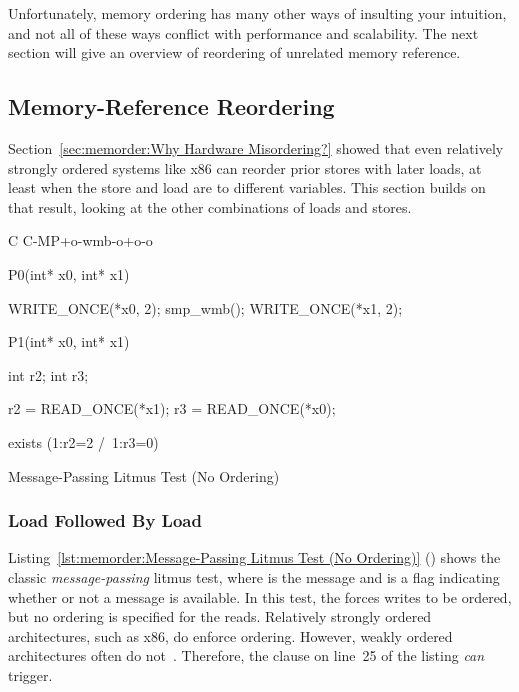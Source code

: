 Unfortunately, memory ordering has many other ways of insulting your
intuition, and not all of these ways conflict with performance and
scalability.
The next section will give an overview of reordering of unrelated
memory reference.
\fi

\subsection{Memory-Reference Reordering}
\label{sec:memorder:Memory-Reference Reordering}

Section~\ref{sec:memorder:Why Hardware Misordering?}
showed that even relatively strongly ordered systems like x86
can reorder prior stores with later loads, at least when the
store and load are to different variables.
This section builds on that result, looking at the other combinations of
loads and stores.


\begin{listing}[tbp]
{ \scriptsize
\begin{verbbox}[\LstLineNo]
C C-MP+o-wmb-o+o-o

{
}


P0(int* x0, int* x1) {

  WRITE_ONCE(*x0, 2);
  smp_wmb();
  WRITE_ONCE(*x1, 2);

}

P1(int* x0, int* x1) {

  int r2;
  int r3;

  r2 = READ_ONCE(*x1);
  r3 = READ_ONCE(*x0);

}

exists (1:r2=2 /\ 1:r3=0)
\end{verbbox}
}
\centering
\theverbbox
\caption{Message-Passing Litmus Test (No Ordering)}
\label{lst:memorder:Message-Passing Litmus Test (No Ordering)}
\end{listing}

\subsubsection{Load Followed By Load}
Listing~\ref{lst:memorder:Message-Passing Litmus Test (No Ordering)}
()
shows the classic \emph{message-passing} litmus test, where  is
the message and  is a flag indicating whether or not a message
is available.
In this test, the  forces  writes to be ordered,
but no ordering is specified for the reads.
Relatively strongly ordered architectures, such as x86, do enforce ordering.
However, weakly ordered architectures often do
not~\cite{JadeAlglave2011ppcmem}.
Therefore, the  clause on line~25 of the listing \emph{can}
trigger.

